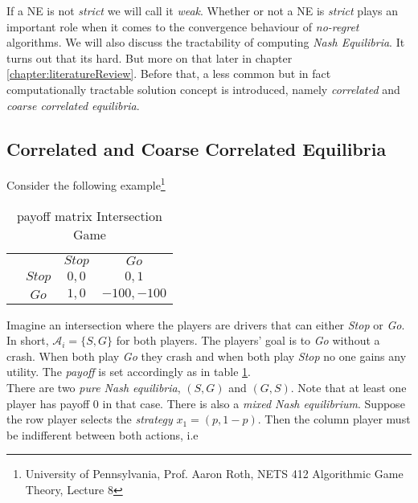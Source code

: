 If a NE is not \textit{strict} we will call it \textit{weak}. Whether or not a NE is \textit{strict} plays an important role when it comes to the convergence behaviour of \textit{no-regret} algorithms. We will also discuss the tractability of computing \textit{Nash Equilibria}. It turns out that its hard. But more on that later in chapter \ref{chapter:literatureReview}. Before that, a less common but in fact computationally tractable solution concept is introduced, namely \textit{correlated} and \textit{coarse correlated equilibria}.\\

\subsection{Correlated and Coarse Correlated Equilibria}\label{subsection:CEandCCE}

Consider the following example\footnote{University of Pennsylvania, Prof. Aaron Roth, NETS 412 Algorithmic Game Theory, Lecture 8}

\begin{table}[H]\centering
\setlength{\extrarowheight}{2pt}
\begin{tabular}{cc|c|c|}
  & \multicolumn{1}{c}{} & \multicolumn{1}{c}{$Stop$}  & \multicolumn{1}{c}{$Go$} \\\cline{3-4}
  & $Stop$ & $0,0$ & $0,1$ \\\cline{3-4}
  & $Go$ & $1,0$ & $-100,-100$ \\\cline{3-4}
\end{tabular}\caption{\label{tab:payoffIntersectionfromFiniteGames}payoff matrix Intersection Game}
\end{table}

Imagine an intersection where the players are drivers that can either \textit{Stop} or \textit{Go}. In short, $\mathcal{A}_i = \{S,G\}$ for both players. The players' goal is to \textit{Go} without a crash. When both play \textit{Go} they crash and when both play \textit{Stop} no one gains any utility. The \textit{payoff} is set accordingly as in table \ref{tab:payoffIntersectionfromFiniteGames}. \\

There are two \textit{pure Nash equilibria}, $(S,G)$ and $(G,S)$. Note that at least one player has payoff $0$ in that case. There is also a \textit{mixed Nash equilibrium}. Suppose the row player selects the \textit{strategy} $x_1 = (p,1-p)$. Then the column player must be indifferent between both actions, i.e 

